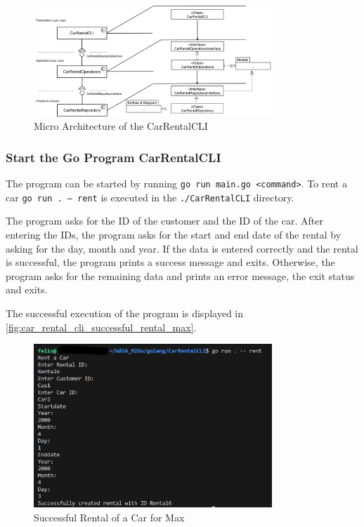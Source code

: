 \begin{figure}
      \centering
      \includegraphics[width=0.8\textwidth]{figures/goLang/carRental/carRentalCLI/carRentalCLI_MicroArchitecture.png}
      \caption{Micro Architecture of the CarRentalCLI}
      \label{fig:car_rental_cli_micro_architecture}
\end{figure}

\subsubsection*{Start the Go Program CarRentalCLI}
The program can be started by running \texttt{go run main.go <command>}.
To rent a car \texttt{go run . --- rent} is executed in the \texttt{./CarRentalCLI} directory.

The program asks for the ID of the customer and the ID of the car.
After entering the IDs, the program asks for the start and end date of the rental by asking for the day, month and year.
If the data is entered correctly and the rental is successful, the program prints a success message and exits.
Otherwise, the program asks for the remaining data and prints an error message, the exit status and exits.

The successful execution of the program is displayed in \autoref{fig:car_rental_cli_successful_rental_max}.

\begin{figure}
      \centering
      \includegraphics[width=0.8\textwidth]{figures/goLang/carRental/carRentalCLI/carRentalCli_SuccessfulRentalMax.png}
      \caption{Successful Rental of a Car for Max}
      \label{fig:car_rental_cli_successful_rental_max}
\end{figure}

